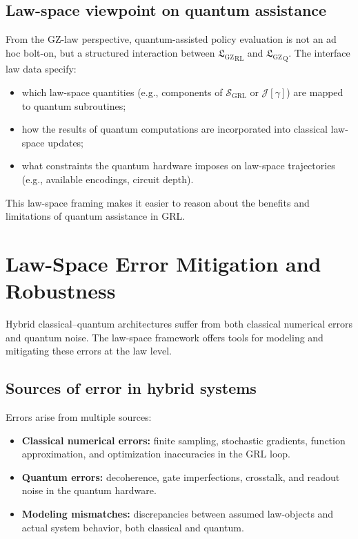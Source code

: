 \documentclass[11pt]{book}
\newcommand{\GZLS}{\ensuremath{\mathfrak{L}_{\mathrm{GZ}}}}
\theoremstyle{plain}
\theoremstyle{definition}
\theoremstyle{remark}
\begin{document}
\subsection*{Law-space viewpoint on quantum assistance}

From the GZ-law perspective, quantum-assisted policy evaluation is
not an ad hoc bolt-on, but a structured interaction between
${\GZLS}_{\mathrm{RL}}$ and ${\GZLS}_{\mathrm{Q}}$. The interface law
data specify:
\begin{itemize}
  \item which law-space quantities (e.g., components of
        $\mathcal{S}_{\mathrm{GRL}}$ or $\mathcal{J}[\gamma]$) are
        mapped to quantum subroutines;
  \item how the results of quantum computations are incorporated
        into classical law-space updates;
  \item what constraints the quantum hardware imposes on law-space
        trajectories (e.g., available encodings, circuit depth).
\end{itemize}

This law-space framing makes it easier to reason about the benefits
and limitations of quantum assistance in GRL.

\section{Law-Space Error Mitigation and Robustness}
\label{sec:lawspace-error-mitigation}


Hybrid classical–quantum architectures suffer from both classical
numerical errors and quantum noise. The law-space framework offers
tools for modeling and mitigating these errors at the law level.

\subsection*{Sources of error in hybrid systems}

Errors arise from multiple sources:
\begin{itemize}
  \item \textbf{Classical numerical errors:}
        finite sampling, stochastic gradients, function approximation,
        and optimization inaccuracies in the GRL loop.
  \item \textbf{Quantum errors:}
        decoherence, gate imperfections, crosstalk, and readout
        noise in the quantum hardware.
  \item \textbf{Modeling mismatches:}
        discrepancies between assumed law-objects and actual system
        behavior, both classical and quantum.
\end{itemize}
\end{document}
